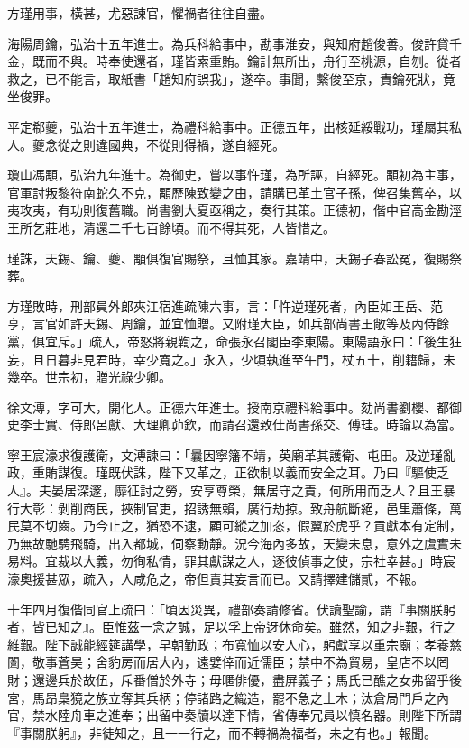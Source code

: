 \begin{pinyinscope}
方瑾用事，橫甚，尤惡諫官，懼禍者往往自盡。

海陽周鑰，弘治十五年進士。為兵科給事中，勘事淮安，與知府趙俊善。俊許貸千金，既而不與。時奉使還者，瑾皆索重賄。鑰計無所出，舟行至桃源，自刎。從者救之，已不能言，取紙書「趙知府誤我」，遂卒。事聞，繫俊至京，責鑰死狀，竟坐俊罪。

平定郗夔，弘治十五年進士，為禮科給事中。正德五年，出核延綏戰功，瑾屬其私人。夔念從之則違國典，不從則得禍，遂自經死。

瓊山馮顒，弘治九年進士。為御史，嘗以事忤瑾，為所誣，自經死。顒初為主事，官軍討叛黎符南蛇久不克，顒歷陳致變之由，請購已革土官子孫，俾召集舊卒，以夷攻夷，有功則復舊職。尚書劉大夏亟稱之，奏行其策。正德初，偕中官高金勘涇王所乞莊地，清還二千七百餘頃。而不得其死，人皆惜之。

瑾誅，天錫、鑰、夔、顒俱復官賜祭，且恤其家。嘉靖中，天錫子春訟冤，復賜祭葬。

方瑾敗時，刑部員外郎夾江宿進疏陳六事，言：「忤逆瑾死者，內臣如王岳、范亨，言官如許天錫、周鑰，並宜恤贈。又附瑾大臣，如兵部尚書王敞等及內侍餘黨，俱宜斥。」疏入，帝怒將親鞫之，命張永召閣臣李東陽。東陽語永曰：「後生狂妄，且日暮非見君時，幸少寬之。」永入，少頃執進至午門，杖五十，削籍歸，未幾卒。世宗初，贈光祿少卿。

徐文溥，字可大，開化人。正德六年進士。授南京禮科給事中。劾尚書劉櫻、都御史李士實、侍郎呂獻、大理卿茆欽，而請召還致仕尚書孫交、傅珪。時論以為當。

寧王宸濠求復護衛，文溥諫曰：「曩因寧籓不靖，英廟革其護衛、屯田。及逆瑾亂政，重賄謀復。瑾既伏誅，陛下又革之，正欲制以義而安全之耳。乃曰『驅使乏人』。夫晏居深邃，靡征討之勞，安享尊榮，無居守之責，何所用而乏人？且王暴行大彰：剝削商民，挾制官吏，招誘無賴，廣行劫掠。致舟航斷絕，邑里蕭條，萬民莫不切齒。乃今止之，猶恐不逮，顧可縱之加恣，假翼於虎乎？貢獻本有定制，乃無故馳騁飛騎，出入都城，伺察動靜。況今海內多故，天變未息，意外之虞實未易料。宜裁以大義，勿徇私情，罪其獻謀之人，逐彼偵事之使，宗社幸甚。」時宸濠奧援甚眾，疏入，人咸危之，帝但責其妄言而已。又請擇建儲貳，不報。

十年四月復偕同官上疏曰：「頃因災異，禮部奏請修省。伏讀聖諭，謂『事關朕躬者，皆已知之』。臣惟茲一念之誠，足以孚上帝迓休命矣。雖然，知之非艱，行之維艱。陛下誠能經筵講學，早朝勤政；布寬恤以安人心，躬獻享以重宗廟；孝養慈闈，敬事蒼昊；舍豹房而居大內，遠嬖倖而近儒臣；禁中不為貿易，皇店不以罔財；還邊兵於故伍，斥番僧於外寺；毋暱俳優，盡屏義子；馬氏已醮之女弗留乎後宮，馬昂梟獍之族立奪其兵柄；停諸路之織造，罷不急之土木；汰倉局門戶之內官，禁水陸舟車之進奉；出留中奏牘以達下情，省傳奉冗員以慎名器。則陛下所謂『事關朕躬』，非徒知之，且一一行之，而不轉禍為福者，未之有也。」報聞。


\end{pinyinscope}
